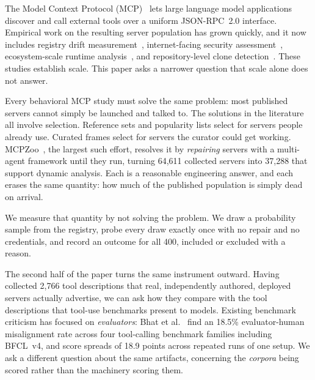 \documentclass[11pt]{article}
\begin{document}
The Model Context Protocol (MCP)~\cite{mcp2024} lets large language model
applications discover and call external tools over a uniform JSON-RPC~2.0
interface. Empirical work on the resulting server population has grown quickly,
and it now includes registry drift measurement~\cite{drift}, internet-facing
security assessment~\cite{exposed}, ecosystem-scale runtime
analysis~\cite{mcpzoo}, and repository-level clone
detection~\cite{cloning}. These studies establish scale. This paper asks a
narrower question that scale alone does not answer.

Every behavioral MCP study must solve the same problem: most published servers
cannot simply be launched and talked to. The solutions in the literature all
involve selection. Reference sets and popularity lists select for servers people
already use. Curated frames select for servers the curator could get working.
MCPZoo~\cite{mcpzoo}, the largest such effort, resolves it by \emph{repairing}
servers with a multi-agent framework until they run, turning 64{,}611 collected
servers into 37{,}288 that support dynamic analysis. Each is a reasonable
engineering answer, and each erases the same quantity: how much of the published
population is simply dead on arrival.

We measure that quantity by not solving the problem. We draw a probability sample
from the registry, probe every draw exactly once with no repair and no
credentials, and record an outcome for all 400, included or excluded with a
reason.

The second half of the paper turns the same instrument outward. Having collected
2{,}766 tool descriptions that real, independently authored, deployed servers
actually advertise, we can ask how they compare with the tool descriptions that
tool-use benchmarks present to models. Existing benchmark criticism has focused
on \emph{evaluators}: Bhat et al.~\cite{benchaudit} find an 18.5\% evaluator-human
misalignment rate across four tool-calling benchmark families including BFCL~v4,
and score spreads of 18.9 points across repeated runs of one setup. We ask a
different question about the same artifacts, concerning the \emph{corpora} being
scored rather than the machinery scoring them.
\end{document}
